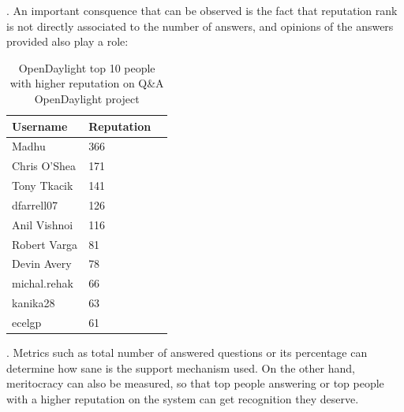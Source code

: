 \documentclass[a4paper, 12pt]{book}
\begin{document}
. An important consquence that can be observed is the fact that reputation rank is not directly associated to the number of answers, and opinions of the answers provided also play a role:
\begin{table}[H]
\footnotesize
\begin{center}
\begin{tabular}{|l|l|p{3cm}|}
\hline
\textbf{Username} & \textbf{Reputation} \\ \hline
 Madhu & 366 \\ \hline
 Chris O'Shea & 171 \\ \hline
 Tony Tkacik & 141 \\ \hline
 dfarrell07 & 126 \\ \hline
 Anil Vishnoi & 116 \\ \hline
 Robert Varga & 81 \\ \hline
 Devin Avery & 78 \\ \hline
 michal.rehak & 66 \\ \hline
 kanika28 & 63 \\ \hline
 ecelgp & 61 \\ \hline
\end{tabular}
\end{center}
\caption{OpenDaylight top 10 people with higher reputation on Q\&A OpenDaylight project}
\label{tab:odl_top_people_reputation}
\end{table}

. Metrics such as total number of answered questions or its percentage can determine how sane is the support mechanism used. On the other hand, meritocracy can also be measured, so that top people answering or top people with a higher reputation on the system can get recognition they deserve.
\end{document}
